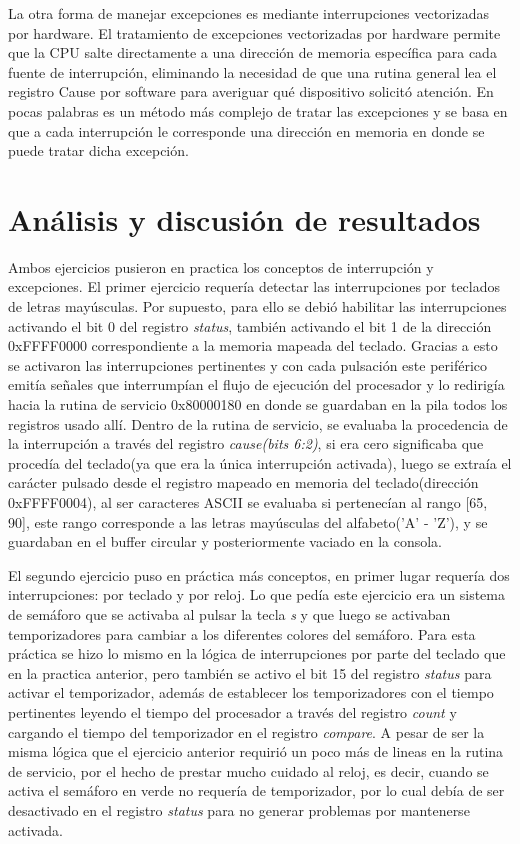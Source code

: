 \documentclass[12pt, a4paper]{article}
\begin{document}
La otra forma de manejar excepciones es mediante interrupciones vectorizadas por hardware. El tratamiento de excepciones vectorizadas por hardware permite que la CPU salte directamente a una dirección de memoria específica para cada fuente de interrupción, eliminando la necesidad de que una rutina general lea el registro Cause por software para averiguar qué dispositivo solicitó atención. En pocas palabras es un método más complejo de tratar las excepciones y se basa en que a cada interrupción le corresponde una dirección en memoria en donde se puede tratar dicha excepción.
\section{Análisis y discusión de resultados}
Ambos ejercicios pusieron en practica los conceptos de interrupción y excepciones. El primer ejercicio requería detectar las interrupciones por teclados de letras mayúsculas. Por supuesto, para ello se debió habilitar las interrupciones activando el bit 0 del registro \textit{status}, también activando el bit 1 de la dirección 0xFFFF0000 correspondiente a la memoria mapeada del teclado. Gracias a esto se activaron las interrupciones pertinentes y con cada pulsación este periférico emitía señales que interrumpían el flujo de ejecución del procesador y lo redirigía hacia la rutina de servicio 0x80000180 en donde se guardaban en la pila todos los registros usado allí. Dentro de la rutina de servicio, se evaluaba la procedencia de la interrupción a través del registro \textit{cause(bits 6:2)}, si era cero significaba que procedía del teclado(ya que era la única interrupción activada), luego se extraía el carácter pulsado desde el registro mapeado en memoria del teclado(dirección 0xFFFF0004), al ser caracteres ASCII se evaluaba si pertenecían al rango [65, 90], este rango corresponde a las letras mayúsculas del alfabeto('A' - 'Z'), y se guardaban en el buffer circular y posteriormente vaciado en la consola.

El segundo ejercicio puso en práctica más conceptos, en primer lugar requería dos interrupciones: por teclado y por reloj. Lo que pedía este ejercicio era un sistema de semáforo que se activaba al pulsar la tecla \textit{s} y que luego se activaban temporizadores para cambiar a los diferentes colores del semáforo. Para esta práctica se hizo lo mismo en la lógica de interrupciones por parte del teclado que en la practica anterior, pero también se activo el bit 15 del registro \textit{status} para activar el temporizador, además de establecer los temporizadores con el tiempo pertinentes leyendo el tiempo del procesador a través del registro \textit{count} y cargando el tiempo del temporizador en el registro \textit{compare}. A pesar de ser la misma lógica que el ejercicio anterior requirió un poco más de lineas en la rutina de servicio, por el hecho de prestar mucho cuidado al reloj, es decir, cuando se activa el semáforo en verde no requería de temporizador, por lo cual debía de ser desactivado en el registro \textit{status} para no generar problemas por mantenerse activada.
\end{document}
